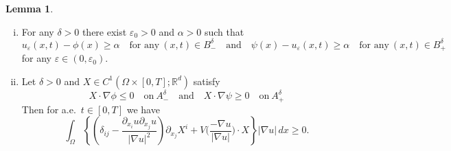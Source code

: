 \documentclass{amsart}
\theoremstyle{definition}
\newtheorem{lemma}[definition]{Lemma}
\def\R{{\mathbb{R}}}
\begin{document}
\begin{lemma}\label{lemma3.3}
\begin{enumerate}[(i)]
\item \label{item:lemma3.3(i)} For any $\delta >0$ there exist $\varepsilon_0 >0$ and $\alpha>0$ such that
\begin{equation}\label{lemma3.3(i)}
u_\varepsilon (x,t) - \phi (x) \geq \alpha \quad \text{for any} \ (x,t) \in B_ - ^\delta
\quad \text{and} \quad
\psi (x) - u_\varepsilon (x,t) \geq \alpha \quad \text{for any} \ (x,t) \in B_ + ^\delta
\end{equation}
for any $\varepsilon \in (0,\varepsilon_0)$.
\item\label{item:lemma3.3(ii)} Let $\delta >0$ and $X \in C^1 (\Omega \times [0,T];\R^d)$ satisfy
\begin{equation}
    X \cdot \nabla \phi \leq 0 \quad \text{on} \ A_ - ^\delta
    \quad \text{and} \quad
    X \cdot \nabla \psi \geq 0 \quad \text{on} \ A_ + ^\delta
\end{equation}
Then for a.e.\ $t \in [0,T]$ we have
\begin{equation}\label{BVineq}
\int_{\Omega} \left\{
 \left( \delta_{ij} - \frac{ \partial_{x_i} u \partial _{x_j} u }{|\nabla u|^2} \right)
\partial_{x_j} X^i
+V\Big(\frac{-\nabla u}{|\nabla u|}\Big)  \cdot X\right\} |\nabla u| \, dx
\geq 0.
\end{equation}
\end{enumerate}
\end{lemma}
\end{document}
